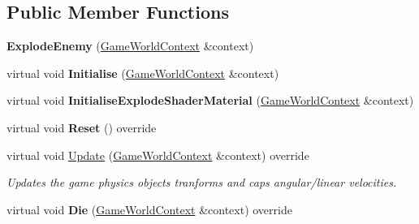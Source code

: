 \subsection*{Public Member Functions}
\begin{DoxyCompactItemize}
\item 
\hypertarget{class_arena_1_1_explode_enemy_a7849da88d288614124da8fb2c81ccfa2}{{\bfseries Explode\+Enemy} (\hyperlink{struct_arena_1_1_game_world_context}{Game\+World\+Context} \&context)}\label{class_arena_1_1_explode_enemy_a7849da88d288614124da8fb2c81ccfa2}

\item 
\hypertarget{class_arena_1_1_explode_enemy_a94afe6e79b40deb834673a8298269c66}{virtual void {\bfseries Initialise} (\hyperlink{struct_arena_1_1_game_world_context}{Game\+World\+Context} \&context)}\label{class_arena_1_1_explode_enemy_a94afe6e79b40deb834673a8298269c66}

\item 
\hypertarget{class_arena_1_1_explode_enemy_aac227b8f8dcbd773183d11c5fe7747ba}{virtual void {\bfseries Initialise\+Explode\+Shader\+Material} (\hyperlink{struct_arena_1_1_game_world_context}{Game\+World\+Context} \&context)}\label{class_arena_1_1_explode_enemy_aac227b8f8dcbd773183d11c5fe7747ba}

\item 
\hypertarget{class_arena_1_1_explode_enemy_a5f6f050d75e1ab9cbe555c748d2576b5}{virtual void {\bfseries Reset} () override}\label{class_arena_1_1_explode_enemy_a5f6f050d75e1ab9cbe555c748d2576b5}

\item 
\hypertarget{class_arena_1_1_explode_enemy_a5176b5c914dd2f40d731095cc92f21a6}{virtual void \hyperlink{class_arena_1_1_explode_enemy_a5176b5c914dd2f40d731095cc92f21a6}{Update} (\hyperlink{struct_arena_1_1_game_world_context}{Game\+World\+Context} \&context) override}\label{class_arena_1_1_explode_enemy_a5176b5c914dd2f40d731095cc92f21a6}

\begin{DoxyCompactList}\small\item\em Updates the game physics objects tranforms and caps angular/linear velocities. \end{DoxyCompactList}\item 
\hypertarget{class_arena_1_1_explode_enemy_ab4a86a86648a4aa3f2202a6a99b4e073}{virtual void {\bfseries Die} (\hyperlink{struct_arena_1_1_game_world_context}{Game\+World\+Context} \&context) override}\label{class_arena_1_1_explode_enemy_ab4a86a86648a4aa3f2202a6a99b4e073}

\end{DoxyCompactItemize}
